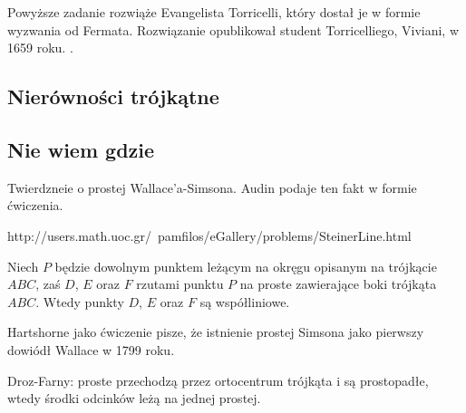 
Powyższe zadanie rozwiąże Evangelista Torricelli, który dostał je w formie wyzwania od Fermata.
%
Rozwiązanie opublikował student Torricelliego, Viviani, w 1659 roku.
. %


\subsection{Nierówności trójkątne}


\subsection{Nie wiem gdzie}


Twierdzneie o prostej Wallace'a-Simsona. %
Audin \cite[s. 104]{audin_2003} podaje ten fakt w formie ćwiczenia.

http://users.math.uoc.gr/~pamfilos/eGallery/problems/SteinerLine.html

\begin{proposition}
	Niech $P$ będzie dowolnym punktem leżącym na okręgu opisanym na trójkącie $ABC$, zaś $D$, $E$ oraz $F$ rzutami punktu $P$ na proste zawierające boki trójkąta $ABC$.
	Wtedy punkty $D$, $E$ oraz $F$ są współliniowe.
\end{proposition}

Hartshorne jako ćwiczenie \cite[s. 61]{hartshorne2000} pisze, że istnienie prostej Simsona jako pierwszy dowiódł Wallace w 1799 roku.

Droz-Farny: proste przechodzą przez ortocentrum trójkąta i są prostopadłe, wtedy środki odcinków leżą na jednej prostej. %

%





